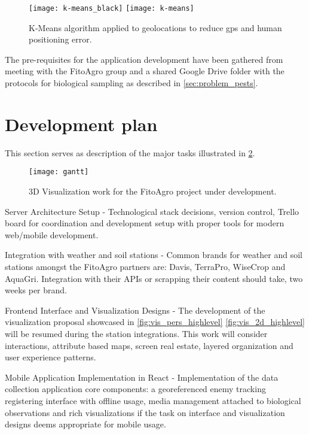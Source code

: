\begin{figure}[htbp]
  \centering
    {\texttt{[image: k-means\_black]}}%
  \hfill  
    {\texttt{[image: k-means]}}%
  \caption{K-Means algorithm applied to geolocations to reduce gps and human positioning error.}
  \label{fig:k-means-clustering}
\end{figure}

The pre-requisites for the application development have been gathered from meeting with the FitoAgro group and a shared Google Drive folder with the protocols for biological sampling as described in \ref{sec:problem_pests}.

\section{Development plan}

This section serves as description of the major tasks illustrated in \ref{fig:gantt}.

\begin{figure}[htbp]
  \centering
  \texttt{[image: gantt]}
  \caption{3D Visualization work for the FitoAgro project under development.}
  \label{fig:gantt}
\end{figure}

Server Architecture Setup - Technological stack decisions, version control, Trello board for coordination and development setup with proper tools for modern web/mobile development.

Integration with weather and soil stations - Common brands for weather and soil stations amongst the FitoAgro partners are: Davis, TerraPro, WiseCrop and AquaGri. Integration with their APIs or scrapping their content should take, two weeks per brand. 

Frontend Interface and Visualization Designs - The development of the visualization proposal showcased in \ref{fig:vis_pers_highlevel} \ref{fig:vis_2d_highlevel} will be resumed during the station integrations. This work will consider interactions, attribute based maps, screen real estate, layered organization and user experience patterns.

Mobile Application Implementation in React - Implementation of the data collection application core components: a georeferenced enemy tracking registering interface with offline usage, media management attached to biological observations and rich visualizations if the task on interface and visualization designs deems appropriate for mobile usage.

